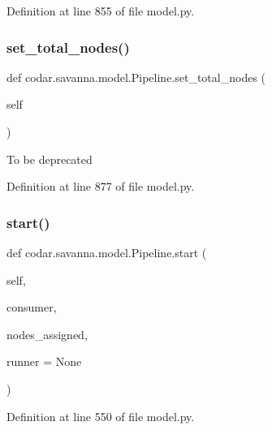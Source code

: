 Definition at line 855 of file model.\+py.

\mbox{\label{classcodar_1_1savanna_1_1model_1_1_pipeline_a372fa98a663eccfd0c629e9e92f411f8}} 
\subsubsection{\texorpdfstring{set\+\_\+total\+\_\+nodes()}{set\_total\_nodes()}}
{\footnotesize\ttfamily def codar.\+savanna.\+model.\+Pipeline.\+set\+\_\+total\+\_\+nodes (\begin{DoxyParamCaption}\item[{}]{self }\end{DoxyParamCaption})}

\begin{DoxyVerb}To be deprecated
\end{DoxyVerb}
 

Definition at line 877 of file model.\+py.

\mbox{\label{classcodar_1_1savanna_1_1model_1_1_pipeline_ad7ddded563710c1a240b850c56a3fd3c}} 
\subsubsection{\texorpdfstring{start()}{start()}}
{\footnotesize\ttfamily def codar.\+savanna.\+model.\+Pipeline.\+start (\begin{DoxyParamCaption}\item[{}]{self,  }\item[{}]{consumer,  }\item[{}]{nodes\+\_\+assigned,  }\item[{}]{runner = {\ttfamily None} }\end{DoxyParamCaption})}



Definition at line 550 of file model.\+py.



